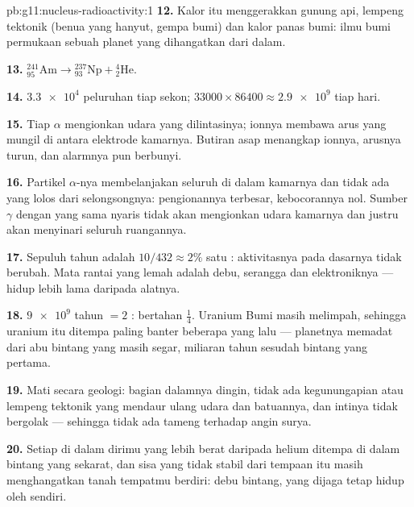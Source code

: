 \begin{solution}{pb:g11:nucleus-radioactivity:1}
\textbf{12.} Kalor itu menggerakkan gunung api, lempeng tektonik (benua
yang hanyut, gempa bumi) dan kalor panas bumi: ilmu bumi permukaan sebuah
planet yang dihangatkan dari dalam.

\textbf{13.} ${}^{241}_{95}\mathrm{Am} \to {}^{237}_{93}\mathrm{Np} +
{}^{4}_{2}\mathrm{He}$.

\textbf{14.} $\num{3.3e4}$ peluruhan tiap sekon;
$\num{33000} \times 86400 \approx \num{2.9e9}$ tiap hari.

\textbf{15.} Tiap $\alpha$ mengionkan udara yang dilintasinya; ionnya
membawa arus yang mungil di antara elektrode kamarnya. Butiran asap
menangkap ionnya, arusnya turun, dan alarmnya pun berbunyi.

\textbf{16.} Partikel $\alpha$-nya membelanjakan seluruh  di dalam
kamarnya dan tidak ada yang lolos dari selongsongnya: pengionannya
terbesar, kebocorannya nol. Sumber $\gamma$ dengan  yang sama
nyaris tidak akan mengionkan udara kamarnya dan justru akan menyinari
seluruh ruangannya.

\textbf{17.} Sepuluh tahun adalah $10/432 \approx 2\%$ satu :
aktivitasnya pada dasarnya tidak berubah. Mata rantai yang lemah adalah
debu, serangga dan elektroniknya ---  hidup lebih lama daripada
alatnya.

\textbf{18.} $\num{9e9}$ tahun $= 2$ : bertahan $\frac14$.
Uranium Bumi masih melimpah, sehingga uranium itu ditempa paling banter
beberapa  yang lalu --- planetnya memadat dari abu bintang yang
masih segar, miliaran tahun sesudah bintang yang pertama.

\textbf{19.} Mati secara geologi: bagian dalamnya dingin, tidak ada
kegunungapian atau lempeng tektonik yang mendaur ulang udara dan batuannya,
dan intinya tidak bergolak --- sehingga tidak ada tameng  terhadap
angin surya.

\textbf{20.} Setiap  di dalam dirimu yang lebih berat daripada helium
ditempa di dalam bintang yang sekarat, dan sisa yang tidak stabil dari
tempaan itu masih menghangatkan tanah tempatmu berdiri: debu bintang, yang
dijaga tetap hidup oleh  sendiri.
\end{solution}
